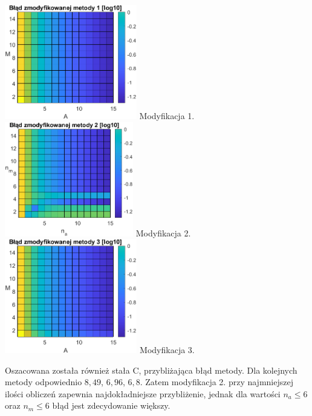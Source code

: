 \documentclass[a4paper,12pt]{article}
\begin{document}
\begin{multicols}{3}
    \small
    \centering
    \includegraphics[height=5cm]{blad1.png}
     \small
    Modyfikacja 1.
    \includegraphics[height=5cm]{blad2.png}
     \small
    Modyfikacja 2.
    \includegraphics[height=5cm]{blad3.png}
     \small
    Modyfikacja 3.
\end{multicols}

    Oszacowana została również stała C, przybliżająca błąd metody. Dla kolejnych metody odpowiednio $8,49$, $6,96$, $6,8$. Zatem modyfikacja 2. przy najmniejszej ilości obliczeń zapewnia najdokładniejsze przybliżenie, jednak dla wartości $n_a\leq 6$ oraz $n_m\leq 6$ błąd jest zdecydowanie większy. 
\end{document}
